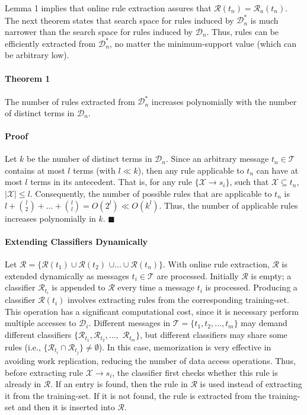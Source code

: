 \documentclass{sig-alternate}
\begin{document}
Lemma 1 implies that online rule extraction assures that $\mathcal{R}(t_n)=\mathcal{R}_a(t_n)$.
The next theorem states that
search space for rules induced by $\mathcal{D}^{*}_n$ is much narrower than the search space for rules induced by $\mathcal{D}_n$. Thus, rules
can be efficiently extracted from $\mathcal{D}^{*}_n$, no matter the minimum-support value (which can be arbitrary low).

\paragraph*{\bf{Theorem 1}}
The number of rules extracted from $\mathcal{D}^{*}_n$ increases polynomially with
the number of distinct terms in $\mathcal{D}_n$.

\paragraph*{\bf{Proof}}
Let $k$ be the number of distinct terms in
$\mathcal{D}_n$.
Since an arbitrary message $t_n\in\mathcal{T}$ contains at most $l$
terms (with $l\ll k$), then any rule applicable to $t_n$
can have at most $l$ terms in its antecedent. That is, for any
rule $\{\mathcal{X}\xrightarrow{}s_i\}$, such that $\mathcal{X}\subseteq t_n$,
$|\mathcal{X}|\le l$. Consequently, the number of
possible rules that are applicable to $t_n$ is
$l+{{l}\choose{2}}+\ldots+{{l}\choose{l}}=O(2^l)\ll O(k^l)$.
Thus, the number of applicable rules increases
polynomially in $k$.
$\blacksquare$\\

\paragraph*{\bf{Extending Classifiers Dynamically}}
Let $\mathcal{R}=\{\mathcal{R}(t_1)\cup\mathcal{R}(t_2)$ $\cup\ldots\cup\mathcal{R}(t_n)\}$.
With online rule extraction, 
$\mathcal{R}$ is extended dynamically as messages $t_i\in\mathcal{T}$ are processed. Initially $\mathcal{R}$ is empty; a classifier $\mathcal{R}_{t_i}$ is appended to $\mathcal{R}$ every time a message $t_i$ is processed.
Producing a classifier $\mathcal{R}(t_i)$ involves extracting rules from the corresponding training-set. This operation has a significant computational cost, since it is necessary perform multiple accesses to $\mathcal{D}_i$.
Different messages in $\mathcal{T}=\{t_1, t_2, \ldots, t_m\}$ may demand different classifiers $\{\mathcal{R}_{t_1}, \mathcal{R}_{t_2}, \ldots,$ $\mathcal{R}_{t_m}\}$,
but different classifiers may share some rules (i.e., $\{\mathcal{R}_{t_i}\cap\mathcal{R}_{t_j}\}\ne\emptyset$).
In this case,
memorization is very effective in avoiding work replication,
reducing the number of data access operations.
Thus, before extracting
rule $\mathcal{X}\xrightarrow{}s_i$, the classifier first checks whether this rule is
already in $\mathcal{R}$. If an entry is found, then the rule
in $\mathcal{R}$ is used instead of extracting it from the training-set. If it is not found, the rule is
extracted from the training-set and then it is inserted into $\mathcal{R}$.
\end{document}

